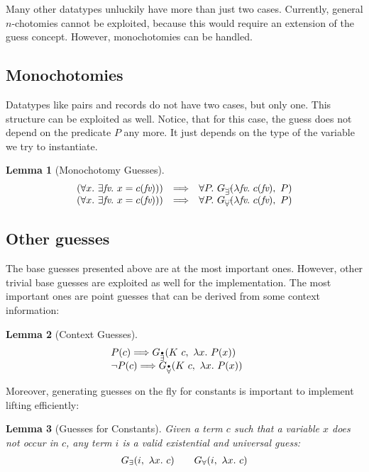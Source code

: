 \documentclass[a4paper,12pt,DIV=12,oneside]{scrbook}
\newcommand{\fv}{\textit{fv}}
\newtheorem{lemma}{Lemma}[section]
\theoremstyle{definition}
\theoremstyle{remark}
\newcommand{\GE}{\ensuremath{G_\exists}}
\newcommand{\GEP}{\ensuremath{G_{\accentset{\bullet}{\exists}}}}
\newcommand{\GEG}{\ensuremath{G_{\accentset{\_\,\_}{\exists}}}}
\newcommand{\GU}{\ensuremath{G_\forall}}
\newcommand{\GUP}{\ensuremath{G_{\accentset{\bullet}{\forall}}}}
\newcommand{\GUG}{\ensuremath{G_{\accentset{\_\,\_}{\forall}}}}
\begin{document}
Many other datatypes unluckily have more than just two
cases. Currently, general $n$-chotomies cannot be exploited, because
this would require an extension of the guess concept.  However,
monochotomies can be handled.

\subsection{Monochotomies}
Datatypes like pairs and records do not have two cases, but only one. This
structure can be exploited as well. Notice, that for this case, the guess does not depend on the predicate $P$ any
more. It just depends on the type of the variable we try to instantiate.
%
\begin{lemma}[Monochotomy Guesses]\label{lemma_guesses_monochotomy}
\[
\begin{array}{l@{\quad}l@{\quad}l}
(\forall x.\ \exists \fv.\ x = c(\fv))) & \Longrightarrow &
\forall P.\ \GEG(\lambda \fv.\ c(\fv),\ P) \\
(\forall x.\ \exists \fv.\ x = c(\fv))) & \Longrightarrow &
\forall P.\ \GUG(\lambda \fv.\ c(\fv),\ P) \\
\end{array}
\]
\end{lemma}

\subsection{Other guesses}
The base guesses presented above are at the most important ones. However, other
trivial base guesses are exploited as well for the implementation.
The most important ones are point guesses that can be derived
from some context information:
%
\begin{lemma}[Context Guesses]\label{lemma_guesses_context}
\[
\begin{array}{l@{\quad\quad}l}
P(c) \Longrightarrow \GEP(K\ c,\ \lambda x.\ P(x))  \\
\neg P(c) \Longrightarrow \GUP(K\ c,\ \lambda x.\ P(x))
\end{array}
\]
\end{lemma}
%
\noindent
Moreover, generating guesses on the fly for constants is important to
implement lifting efficiently:
%
\begin{lemma}[Guesses for Constants]\label{lemma_guesses_const}
Given a term $c$ such that a variable $x$ does not occur in $c$, any term $i$ is a
valid existential and universal guess:
\[
\begin{array}{l@{\quad\quad}l}
\GE(i,\ \lambda x.\ c) & \GU(i,\ \lambda x.\ c)
\end{array}
\]
\end{lemma}
\end{document}
